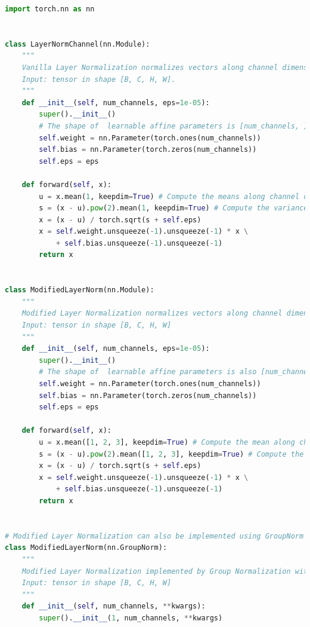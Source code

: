 \begin{algorithm*}[t]
\caption{Comparison between Layer Normalization and Modified Layer Normalization, PyTorch-like Code}
\label{alg:norm}
\begin{lstlisting}[language=python]
import torch.nn as nn


class LayerNormChannel(nn.Module):
    """
    Vanilla Layer Normalization normalizes vectors along channel dimension.
    Input: tensor in shape [B, C, H, W].
    """
    def __init__(self, num_channels, eps=1e-05):
        super().__init__()
        # The shape of  learnable affine parameters is [num_channels, ].
        self.weight = nn.Parameter(torch.ones(num_channels))
        self.bias = nn.Parameter(torch.zeros(num_channels))
        self.eps = eps

    def forward(self, x):
        u = x.mean(1, keepdim=True) # Compute the means along channel dimension.
        s = (x - u).pow(2).mean(1, keepdim=True) # Compute the variances along channel dimension.
        x = (x - u) / torch.sqrt(s + self.eps)
        x = self.weight.unsqueeze(-1).unsqueeze(-1) * x \
            + self.bias.unsqueeze(-1).unsqueeze(-1)
        return x
        

class ModifiedLayerNorm(nn.Module):
    """
    Modified Layer Normalization normalizes vectors along channel dimension and spatial dimensions.
    Input: tensor in shape [B, C, H, W]
    """
    def __init__(self, num_channels, eps=1e-05):
        super().__init__()
        # The shape of  learnable affine parameters is also [num_channels, ], keeping the same as vanilla Layer Normalization.
        self.weight = nn.Parameter(torch.ones(num_channels))
        self.bias = nn.Parameter(torch.zeros(num_channels))
        self.eps = eps

    def forward(self, x):
        u = x.mean([1, 2, 3], keepdim=True) # Compute the mean along channel dimension and spatial dimensions.
        s = (x - u).pow(2).mean([1, 2, 3], keepdim=True) # Compute the variance along channel dimension and spatial dimensions.
        x = (x - u) / torch.sqrt(s + self.eps)
        x = self.weight.unsqueeze(-1).unsqueeze(-1) * x \
            + self.bias.unsqueeze(-1).unsqueeze(-1)
        return x
        

# Modified Layer Normalization can also be implemented using GroupNorm API in PyTorch by setting the group number as 1.        
class ModifiedLayerNorm(nn.GroupNorm):
    """
    Modified Layer Normalization implemented by Group Normalization with 1 group.
    Input: tensor in shape [B, C, H, W]
    """
    def __init__(self, num_channels, **kwargs):
        super().__init__(1, num_channels, **kwargs)
\end{lstlisting}
\end{algorithm*}


